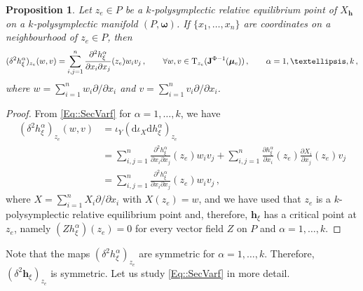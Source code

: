 \documentclass[11pt]{article}
\theoremstyle{plain}
\newtheorem{proposition}[theorem]{Proposition}
\theoremstyle{definition}
\newcommand{\T}{\mathrm{T}}
\newcommand{\bh}{{\boldsymbol{h}}}
\renewcommand{\d}{\mathrm{d}}
\def\d{\mathrm{d}}
\numberwithin{equation}{section}
\begin{document}
\begin{proposition}
Let $z_e\in P$ be a $k$-polysymplectic relative equilibrium point of $X_\bh$ on a $k$-polysymplectic manifold $(P,\boldsymbol{\omega})$. If $\{x_1,\ldots,x_{n}\}$ are coordinates on a neighbourhood of $z_e\in P$, then
\begin{equation}
\label{Eq::SecVarFormh}
(\delta^2h_{\xi}^\alpha)_{z_e}(w,v)=\sum^{n}_{i,j=1}\frac{\partial^2h^\alpha_{\xi}}{\partial x_i\partial x_j}(z_e)w_iv_j\,,\qquad \forall w,v\in \T_{z_e}({\bf J}^{\Phi-1}(\bm\mu_e))\,,\qquad \alpha=1,\ldots,k\,,
\end{equation}
where $w=\sum_{i=1}^{n}w_i\partial/\partial x_i$ and $v=\sum_{i=1}^{n}v_i\partial/\partial x_i$.
\end{proposition}
\begin{proof}
From \eqref{Eq::SecVarf} for $\alpha=1,\ldots,k$, we have
\begin{align*}
(\delta^2h^\alpha_{\xi})_{z_e}(w,v) &= \iota_Y(\d\iota_{X}\d  h^\alpha_{\xi})_{z_e}\\
&= \sum^{n}_{i,j=1}\frac{\partial^2h^\alpha_{\xi}}{\partial x_i\partial x_j}(z_e)w_iv_j+\sum^{n}_{i,j=1}\frac{\partial h^\alpha_{\xi}}{\partial x_i}(z_e)\frac{\partial X_i}{\partial x_j}(z_e)v_j\\
&= \sum^{n}_{i,j=1}\frac{\partial^2h^\alpha_{\xi}}{\partial x_i\partial x_j}(z_e)w_iv_j\,,
\end{align*}
where $X=\sum_{i=1}^{n}X_i\partial/\partial x_i$ with $X(z_e)=w$, and we have used that $z_e$ is a $k$-polysymplectic relative equilibrium point and, therefore, ${\bm h}_\xi$ has a critical point at $z_e$, namely $(Zh^\alpha_\xi)(z_e)=0$ for every vector field $Z$ on $P$ and $\alpha=1,\ldots,k$.
\end{proof}
Note that the maps $(\delta^2h_\xi^\alpha)_{z_e}$ are symmetric for $\alpha=1,\ldots,k$. Therefore, $(\delta^2\bm h_\xi)_{z_e}$ is symmetric. Let us study \eqref{Eq::SecVarf} in more detail.
\end{document}
